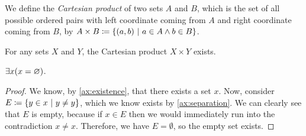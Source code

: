 % 
%         
% 
% 
% 

\begin{definition}
    We define the \emph{Cartesian product} of two sets $A$ and $B$,
    which is the set of all possible ordered pairs with
    left coordinate coming from $A$ and right coordinate coming from $B$,
    by $A \times B \defn \set*{(a, b) \suchthat a \in A \meet b \in B}$.
\end{definition}

\begin{theorem}
    For any sets $X$ and $Y$, the Cartesian product $X \times Y$ exists.
\end{theorem}

\begin{theorem}
    $\exists x \pn*{x = \emptyset}$.
\end{theorem}
\begin{proof}
    We know, by \autoref{ax:existence}, that there exists a set $x$.
    Now, consider $E \defn \set*{y \in x \suchthat  y \neq y}$,
    which we know exists by \autoref{ax:separation}.
    We can clearly see that $E$ is empty,
    because if $x \in E$ then we would immediately run into the contradiction $x \neq x$.
    Therefore, we have $E = \emptyset$, so the empty set exists.
\end{proof}


